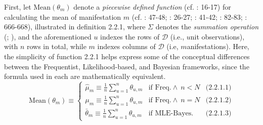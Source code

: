\documentclass[
  10pt,
  a4paper,
  twoside]{article}
\begin{document}
First, let \(\text{Mean}(\theta_m)\) denote a \emph{piecewise defined function} (cf. : 16-17) for calculating the mean of manifestation \(m\) (cf. : 47-48; : 26-27; : 41-42; : 82-83; : 666-668), illustrated in definition 2.2.1, where \(\Sigma\) denotes the \emph{summation operation} (; ), and the aforementioned \(u\) indexes the rows of \(\mathcal{D}\) (i.e., \(u\)nit observations), with \(n\) rows in total, while \(m\) indexes columns of \(\mathcal{D}\) (i.e, \(m\)anifestations). Here, the simplicity of function 2.2.1 helps express some of the conceptual differences between the Frequentist, Likelihood-based, and Bayesian frameworks, since the formula used in each are mathematically equivalent.
\[
\text{Mean}(\theta_m) \equiv
\left\{
\begin{array}{lll}
  \hat{\mu}_m \equiv \frac{1}{n} \sum_{u=1}^{n} \theta_{u,m} & \text{if Freq.} \land\ n < N & \text{(2.2.1.1)} \\
  \mu_m \equiv \frac{1}{n} \sum_{u=1}^{n} \theta_{u,m} & \text{if Freq.} \land\ n = N & \text{(2.2.1.2)} \\
  \bar{\theta}_m \equiv \frac{1}{n} \sum_{u=1}^{n} \theta_{u,m} & \text{if MLE-Bayes.} & \text{(2.2.1.3)}
\end{array}
\right.
\tag{2.2.1}
\]
\end{document}
